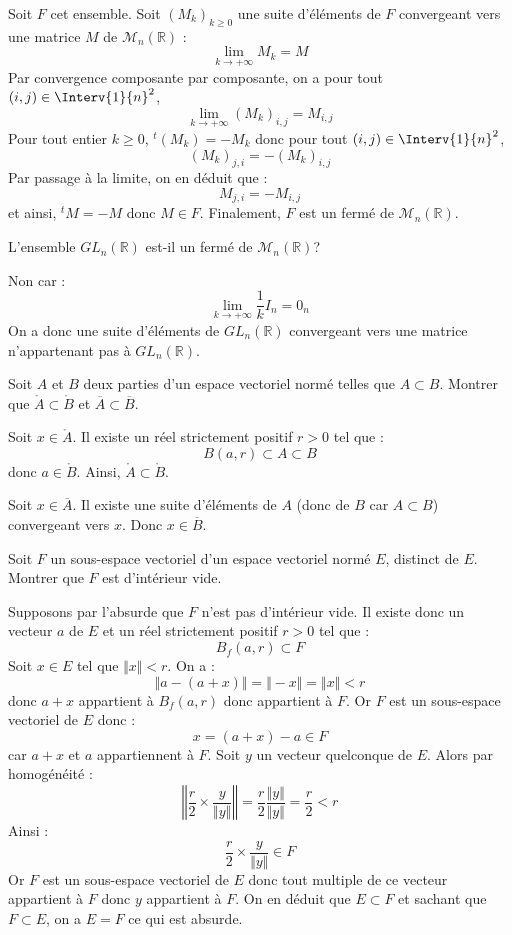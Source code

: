 \documentclass[a4paper,10pt]{report}
\begin{document}
\corr Soit $F$ cet ensemble. Soit $(M_k)_{k \geq 0}$ une suite d'éléments de $F$ convergeant vers une matrice $M$ de $\mathcal{M}_n(\mathbb{R})$ :
$$ \lim_{k \rightarrow + \infty} M_k = M$$
Par convergence composante par composante, on a pour tout $(i,j) \in \Interv{1}{n}^2$,
$$  \lim_{k \rightarrow + \infty} (M_k)_{i,j} = M_{i,j}$$
Pour tout entier $k \geq 0$, $^t(M_k)=-M_k$ donc pour tout $(i,j) \in \Interv{1}{n}^2$,
$$ (M_k)_{j,i} = - (M_k)_{i,j}$$
Par passage à la limite, on en déduit que :
$$ M_{j,i}=-M_{i,j}$$
et ainsi, $^t M=-M$ donc $M \in F$. Finalement, $F$ est un fermé de $\mathcal{M}_n(\mathbb{R})$.

\begin{Exercice}{} L'ensemble $GL_n(\mathbb{R})$ est-il un fermé de $\mathcal{M}_n(\mathbb{R})$?
\end{Exercice} 

\corr Non car :
$$ \lim_{k \rightarrow + \infty} \dfrac{1}{k} I_n = 0_n$$
On a donc une suite d'éléments de $GL_n(\mathbb{R})$ convergeant vers une matrice n'appartenant pas à $GL_n(\mathbb{R})$.


\begin{Exercice}{} Soit $A$ et $B$ deux parties d'un espace vectoriel normé telles que $A \subset B$. Montrer que $\mathring{A} \subset \mathring{B}$ et $\overline{A} \subset \overline{B}$.
\end{Exercice}

\corr Soit $x \in \mathring{A}$. Il existe un réel strictement positif $r>0$ tel que :
$$ B(a,r) \subset A \subset B$$
donc $a \in  \mathring{B}$. Ainsi, $\mathring{A} \subset \mathring{B}$.

\medskip

\noindent Soit $x \in \overline{A}$. Il existe une suite d'éléments de $A$ (donc de $B$ car $A \subset B$) convergeant vers $x$. Donc $x \in \overline{B}$.


\begin{Exercice}{} Soit $F$ un sous-espace vectoriel d'un espace vectoriel normé $E$, distinct de $E$. Montrer que $F$ est d'intérieur vide.
\end{Exercice}

\corr Supposons par l'absurde que $F$ n'est pas d'intérieur vide. Il existe donc un vecteur $a$ de $E$ et un réel strictement positif $r>0$ tel que :
$$ B_f(a,r) \subset F$$
Soit $x \in E$ tel que $\Vert x \Vert <r$. On a :
$$ \Vert a-(a+x) \Vert =  \Vert -x \Vert = \Vert x \Vert < r$$
donc $a+x$ appartient à $B_f(a,r)$ donc appartient à $F$. Or $F$ est un sous-espace vectoriel de $E$ donc :
$$ x = (a+x) -a \in F$$
car $a+x$ et $a$ appartiennent à $F$. Soit $y$ un vecteur quelconque de $E$. Alors par homogénéité :
$$ \left\Vert \dfrac{r}{2} \times \dfrac{y}{\Vert y \Vert } \right\Vert  = \dfrac{r}{2} \dfrac{\Vert y \Vert }{\Vert y \Vert } = \dfrac{r}{2} < r$$
Ainsi :
$$ \dfrac{r}{2} \times \dfrac{y}{\Vert y \Vert } \in F$$
Or $F$ est un sous-espace vectoriel de $E$ donc tout multiple de ce vecteur appartient à $F$ donc $y$ appartient à $F$. On en déduit que $E \subset F$ et sachant que $F \subset E$, on a $E=F$ ce qui est absurde.
\end{document}
